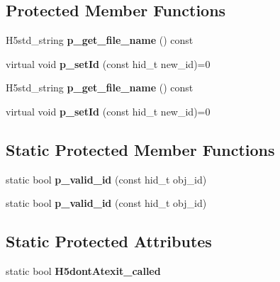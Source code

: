 \subsection*{Protected Member Functions}
\begin{DoxyCompactItemize}
\item 
\mbox{\label{class_h5_1_1_id_component_a8d7833f92b30385e663f4f0a751e5a5e}} 
H5std\+\_\+string {\bfseries p\+\_\+get\+\_\+file\+\_\+name} () const
\item 
\mbox{\label{class_h5_1_1_id_component_a23accf3cee556a841e9388a2e410ccb7}} 
virtual void {\bfseries p\+\_\+set\+Id} (const hid\+\_\+t new\+\_\+id)=0
\item 
\mbox{\label{class_h5_1_1_id_component_a8d7833f92b30385e663f4f0a751e5a5e}} 
H5std\+\_\+string {\bfseries p\+\_\+get\+\_\+file\+\_\+name} () const
\item 
\mbox{\label{class_h5_1_1_id_component_a23accf3cee556a841e9388a2e410ccb7}} 
virtual void {\bfseries p\+\_\+set\+Id} (const hid\+\_\+t new\+\_\+id)=0
\end{DoxyCompactItemize}
\subsection*{Static Protected Member Functions}
\begin{DoxyCompactItemize}
\item 
\mbox{\label{class_h5_1_1_id_component_a4a14b40542e488a4edf3547abc041ebc}} 
static bool {\bfseries p\+\_\+valid\+\_\+id} (const hid\+\_\+t obj\+\_\+id)
\item 
\mbox{\label{class_h5_1_1_id_component_a4a14b40542e488a4edf3547abc041ebc}} 
static bool {\bfseries p\+\_\+valid\+\_\+id} (const hid\+\_\+t obj\+\_\+id)
\end{DoxyCompactItemize}
\subsection*{Static Protected Attributes}
\begin{DoxyCompactItemize}
\item 
\mbox{\label{class_h5_1_1_id_component_a9ef738f653042a0295cd6d2c8dff00ca}} 
static bool {\bfseries H5dont\+Atexit\+\_\+called}
\end{DoxyCompactItemize}


